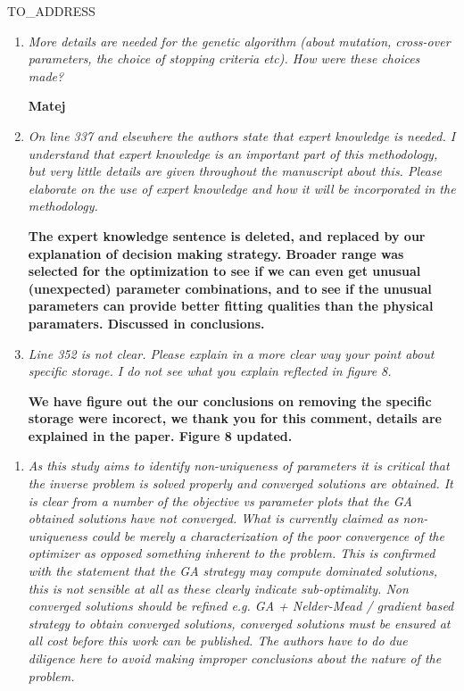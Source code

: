 \documentclass[a4paper,10pt]{letter}
\begin{document}
\begin{letter}{TO_ADDRESS}
\begin{enumerate}
 {\bf This is not truly multi-objective algorithm Matej will explain}
 
 \item {\it More details are needed for the genetic algorithm (about mutation, cross-over parameters, the choice of stopping criteria etc). How were these choices made? }
 
 {\bf Matej}
 
 \item {\it On line 337 and elsewhere the authors state that expert knowledge is needed.  I understand that expert knowledge is an important part of this methodology, but very little details are given throughout the manuscript about this. Please elaborate on the use of expert knowledge and how it will be incorporated in the methodology.}
 
 {\bf The expert knowledge sentence is deleted, and replaced by our explanation of decision making strategy. Broader range was  selected for the optimization to see if we can even get unusual (unexpected) parameter combinations, and to see if the unusual parameters can provide better fitting qualities than the physical paramaters. Discussed in conclusions.}
 
 
 \item {\it   Line 352 is not clear. Please explain in a more clear way your point about specific storage. I do not see what you explain reflected in figure 8.}
 
 {\bf We have figure out the our conclusions on removing the specific storage were incorect, we thank you for this comment, details are explained in the paper. Figure 8 updated.}
 
 
\end{enumerate}


\begin{enumerate}
 \item {\it As this study aims to identify non-uniqueness of parameters it is critical that the inverse problem is solved properly and converged solutions are obtained. It is clear from a number of the objective vs parameter plots that the GA obtained solutions have not converged. What is currently claimed as non-uniqueness could be merely a characterization of the poor convergence of the optimizer as opposed something inherent to the problem. This is confirmed with the statement that the GA strategy may compute dominated solutions, this is not sensible at all as these clearly indicate sub-optimality. Non converged solutions should be refined e.g. GA + Nelder-Mead / gradient based strategy to obtain converged solutions, converged solutions must be ensured at all cost before this work can be published. The authors have to do due diligence here
 to avoid making improper conclusions about the nature of the problem.}


\end{enumerate}
\end{letter}
\end{document}

